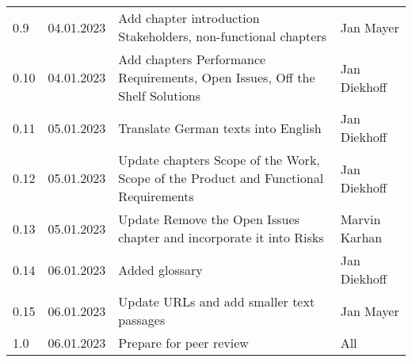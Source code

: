 \begin{footnotesize}
\begin{longtable}[L L L L]{ p{} p{} p{} p{} }
    0.9              & 04.01.2023    & Add chapter introduction Stakeholders, non-functional chapters                     & Jan Mayer       \\
    
    0.10              & 04.01.2023    & Add chapters Performance Requirements, Open Issues, Off the Shelf Solutions        & Jan Diekhoff    \\
    
    0.11              & 05.01.2023    & Translate German texts into English                                                 & Jan Diekhoff    \\
    
    0.12             & 05.01.2023    & Update chapters Scope of the Work, Scope of the Product and Functional Requirements & Jan Diekhoff    \\
    
    0.13             & 05.01.2023    & Update Remove the Open Issues chapter and incorporate it into Risks                  & Marvin Karhan   \\
    
    0.14             & 06.01.2023    & Added glossary                                                                       & Jan Diekhoff    \\
    
    0.15             & 06.01.2023    & Update URLs and add smaller text passages                                            & Jan Mayer       \\
    1.0 & 06.01.2023 & Prepare for peer review & All \\
    
    \bottomrule
  \end{longtable}
\end{footnotesize}
\rmfamily